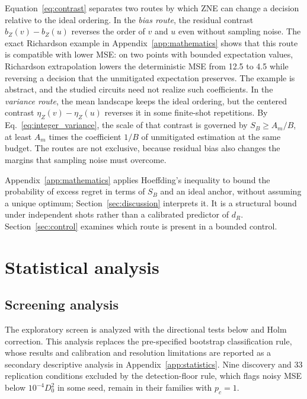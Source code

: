 Equation~\eqref{eq:contrast} separates two routes by which ZNE can change a decision relative to the ideal ordering. In the \emph{bias route}, the residual contrast $b_Z(v)-b_Z(u)$ reverses the order of $v$ and $u$ even without sampling noise. The exact Richardson example in Appendix~\ref{app:mathematics} shows that this route is compatible with lower MSE: on two points with bounded expectation values, Richardson extrapolation lowers the deterministic MSE from 12.5 to 4.5 while reversing a decision that the unmitigated expectation preserves. The example is abstract, and the studied circuits need not realize such coefficients. In the \emph{variance route}, the mean landscape keeps the ideal ordering, but the centered contrast $\eta_Z(v)-\eta_Z(u)$ reverses it in some finite-shot repetitions. By Eq.~\eqref{eq:integer_variance}, the scale of that contrast is governed by $S_B\ge A_m/B$, at least $A_m$ times the coefficient $1/B$ of unmitigated estimation at the same budget. The routes are not exclusive, because residual bias also changes the margins that sampling noise must overcome.

Appendix~\ref{app:mathematics} applies Hoeffding's inequality \citep{Hoeffding1963} to bound the probability of excess regret in terms of $S_B$ and an ideal anchor, without assuming a unique optimum; Section~\ref{sec:discussion} interprets it. It is a structural bound under independent shots rather than a calibrated predictor of $d_R$. Section~\ref{sec:control} examines which route is present in a bounded control.

\section{Statistical analysis}\label{sec:statistics}
\subsection{Screening analysis}\label{sec:screening}
The exploratory screen is analyzed with the directional tests below and Holm correction. This analysis replaces the pre-specified bootstrap classification rule, whose results and calibration and resolution limitations are reported as a secondary descriptive analysis in Appendix~\ref{app:statistics}. Nine discovery and 33 replication conditions excluded by the detection-floor rule, which flags noisy MSE below $10^{-4}D_0^2$ in some seed, remain in their families with $p_c=1$.


